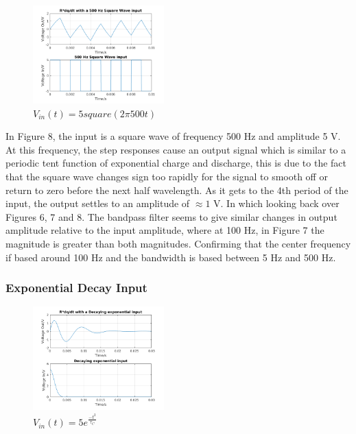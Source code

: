 \documentclass[11pt,a4paper]{article}
\begin{document}
\begin{figure}
    \vspace{-5mm}
  		\includegraphics[width=0.45\textwidth]{Ex3_Figs/500Squ1.png}
	\vspace{-6mm}
  	\caption{$V_{in}(t)= 5square(2 \pi 500t)$}
  	\label{fig:ex3g7}
\end{figure}

\vspace{5mm}In Figure 8, the input is a square wave of frequency 500 Hz and amplitude 5 V. At this frequency, the step responses cause an output signal which is similar to a periodic tent function of exponential charge and discharge, this is due to the fact that the square wave changes sign too rapidly for the signal to smooth off or return to zero before the next half wavelength. As it gets to the 4th period of the input, the output settles to an amplitude of $\approx 1$ V. In which looking back over Figures 6, 7 and 8. The bandpass filter seems to give similar changes in output amplitude relative to the input amplitude, where at 100 Hz, in Figure 7 the magnitude is greater than both magnitudes. Confirming that the center frequency if based around 100 Hz and the bandwidth is based between 5 Hz and 500 Hz.

\subsubsection{Exponential Decay Input}

\begin{figure}
    \vspace{-23mm}
  		\includegraphics[width=0.45\textwidth]{Ex3_Figs/DecExp.png}
	\vspace{-6mm}
  	\caption{$V_{in}(t)= 5e^{\frac{-t^2}{\tau_C}}$}
  	\label{fig:ex3g8}
\end{figure}
\end{document}
